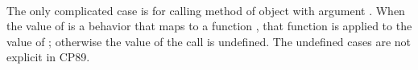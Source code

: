 \begin{AgdaAlign}
\begin{code}
\AgdaSymbol{)}\AgdaSpace{}%
\AgdaSymbol{)}\AgdaSpace{}%
\AgdaOperator{\AgdaBound{,}}\<%
\\
%
\>[32]\AgdaSymbol{(}\AgdaSpace{}%
\AgdaSpace{}%
\AgdaBound{\AgdaUnderscore{}}\AgdaSpace{}%
\AgdaSpace{}%
\AgdaSpace{}%
\AgdaSymbol{)}\<%
\\
\>[.][@{}l@{}]\<[486I]%
\>[29]\AgdaOperator{\AgdaBound{]⊥}}\AgdaSpace{}%
\AgdaSymbol{(}\AgdaSpace{}%
\AgdaSpace{}%
\AgdaSymbol{)}\AgdaSpace{}%
\AgdaSymbol{)}\AgdaSpace{}%
\AgdaOperator{\AgdaBound{,}}\<%
\\
\>[.][@{}l@{}]\<[482I]%
\>[21]\AgdaSymbol{(}\AgdaSpace{}%
\AgdaSpace{}%
\AgdaSpace{}%
\AgdaSpace{}%
\AgdaSpace{}%
\AgdaSymbol{)}\<%
\\
\>[.][@{}l@{}]\<[481I]%
\>[19]\AgdaOperator{\AgdaBound{]⊥}}\AgdaSpace{}%
\AgdaSymbol{(}\AgdaSpace{}%
\AgdaSymbol{(}\AgdaSpace{}%
\AgdaSymbol{(}\AgdaSpace{}%
\AgdaSpace{}%
\AgdaSpace{}%
\AgdaSpace{}%
\AgdaSymbol{)}\AgdaSpace{}%
\AgdaSymbol{))}\<%
\\
%
\>[6]\AgdaSpace{}%
\AgdaSpace{}%
\AgdaSpace{}%
%
\>[24]\AgdaSpace{}%
\AgdaSpace{}%
%
\>[31]\AgdaSymbol{=}\<%
\\
\>[6][@{}l@{\AgdaIndent{0}}]%
\>[8]\AgdaSpace{}%
\AgdaSpace{}%
\AgdaSpace{}%
\AgdaSpace{}%
\AgdaSpace{}%
\AgdaSpace{}%
\AgdaSpace{}%
\AgdaSymbol{(}\AgdaSpace{}%
\AgdaSymbol{(}\AgdaSpace{}%
\AgdaSpace{}%
\AgdaSpace{}%
\AgdaSpace{}%
\AgdaSymbol{)}\AgdaSpace{}%
\AgdaSymbol{)}\<%
\end{code}
%
The only complicated case is for calling method  of object  
with argument .
When the value of  is a behavior  that maps  to a function ,
that function is applied to the value of ;
otherwise the value of the call is undefined.
The undefined cases are not explicit in CP89.


\end{AgdaAlign}

